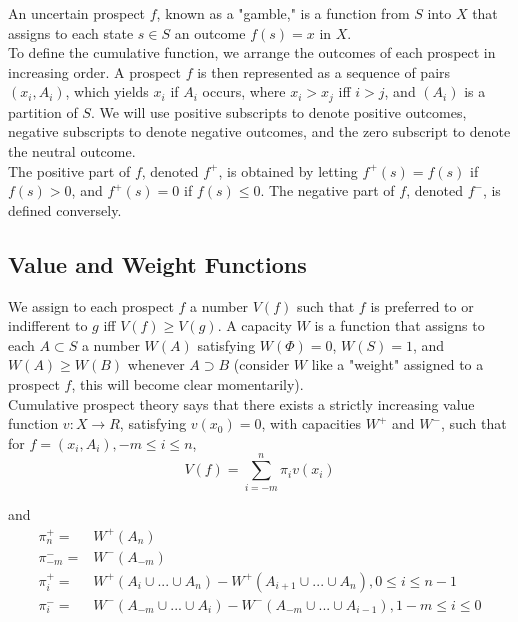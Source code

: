 \documentclass[a4paper,12pt]{article}
\numberwithin{equation}{section}
\theoremstyle{definition}
\begin{document}
\indent An uncertain prospect $f$, known as a "gamble," is a function from $S$ into $X$ that assigns to each state $s \in S$ an outcome $f(s) = x$ in $X$. 
\\

\indent To define the cumulative function, we arrange the outcomes of each prospect in increasing order. A prospect $f$ is then represented as a sequence of pairs $(x_i,A_i)$, which yields $x_i$ if $A_i$ occurs, where $x_i > x_j$ iff $i > j$, and $(A_i)$ is a partition of $S$. We will use positive subscripts to denote positive outcomes, negative subscripts to denote negative outcomes, and the zero subscript to denote the neutral outcome.
\\

\indent The positive part of $f$, denoted $f^+$, is obtained by letting $f^+(s) = f(s)$ if $f(s) > 0$, and $f^+(s) = 0$ if $f(s) \leq 0$. The negative part of $f$, denoted $f^-$, is defined conversely.

\subsection{Value and Weight Functions}
\indent We assign to each prospect $f$ a number $V(f)$ such that $f$ is preferred to or indifferent to $g$ iff $V(f) \geq V(g)$. A capacity $W$ is a function that assigns to each $A \subset S$ a number $W(A)$ satisfying $W(\Phi) = 0$, $W(S) = 1$, and $W(A) \geq W(B)$ whenever $A \supset B$ (consider $W$ like a "weight" assigned to a prospect $f$, this will become clear momentarily).
\\

\indent Cumulative prospect theory says that there exists a strictly increasing value function $v:X \rightarrow R$, satisfying $v(x_0) = 0$, with capacities $W^+$ and $W^-$, such that for $f = (x_i, A_i), -m \leq i \leq n$,
\begin{equation}\label{eq:1}
V(f) = \sum_{i=-m}^{n}\pi_iv(x_i)
\end{equation}

and
\begin{eqnarray*}
\pi_n^+ =& W^+(A_n)\\
\pi_{-m}^- =& W^-(A_{-m})\\
\pi_i^+ =& W^+(A_i\cup ... \cup A_n) - W^+(A_{i+1}\cup ... \cup A_n), 0 \leq i \leq n - 1\\
\pi_i^- =& W^-(A_{-m}\cup ... \cup A_i) - W^-(A_{-m}\cup ... \cup A_{i-1}), 1 - m \leq i \leq 0
\end{eqnarray*}
\end{document}
